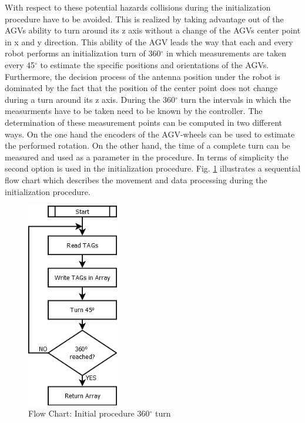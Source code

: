 With respect to these potential hazards collisions during the initialization procedure have to be avoided. This is realized by taking advantage out of the AGVs ability to turn around its z axis without a change of the AGVs center point in x and y direction. This ability of the AGV leads the way that each and every robot performs an initialization turn of 360$^\circ$ in which measurements are taken every 45$^\circ$ to estimate the specific positions and orientations of the AGVs. Furthermore, the decision process of the antenna position under the robot is dominated by the fact that the position of the center point does not change during a turn around its z axis. 
During the 360$^\circ$ turn the intervals in which the measurments have to be taken need to be known by the controller. The determination of these measurement points can be computed in two different ways. On the one hand the encoders of the AGV-wheels can be used to estimate the performed rotation. On the other hand, the time of a complete turn can be measured and used as a parameter in the procedure. In terms of simplicity the second option is used in the initialization procedure.  
Fig. \ref{SFC_Init_Procedure} illustrates a sequential flow chart which describes the movement and data processing during the initialization procedure.\\ 
\begin{figure}[!htbp]
\centering
\includegraphics[width = 4cm]{Pictures/SFC_Init_Procedure}
\caption{Flow Chart: Initial procedure 360$^\circ$ turn}
\label{SFC_Init_Procedure}
\end{figure}\\\\\\\\\\\\\\\\
